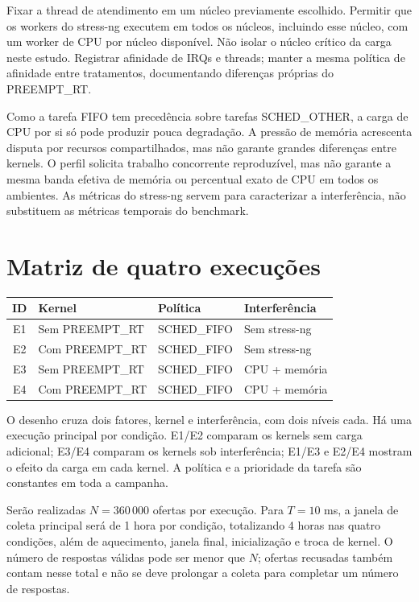 \documentclass[11pt,a4paper]{article}
\begin{document}
Fixar a thread de atendimento em um núcleo previamente escolhido. Permitir que os workers do stress-ng executem em todos os núcleos, incluindo esse núcleo, com um worker de CPU por núcleo disponível. Não isolar o núcleo crítico da carga neste estudo. Registrar afinidade de IRQs e threads; manter a mesma política de afinidade entre tratamentos, documentando diferenças próprias do PREEMPT\_RT.

Como a tarefa FIFO tem precedência sobre tarefas SCHED\_OTHER, a carga de CPU por si só pode produzir pouca degradação. A pressão de memória acrescenta disputa por recursos compartilhados, mas não garante grandes diferenças entre kernels. O perfil solicita trabalho concorrente reproduzível, mas não garante a mesma banda efetiva de memória ou percentual exato de CPU em todos os ambientes. As métricas do stress-ng servem para caracterizar a interferência, não substituem as métricas temporais do benchmark.

\section{Matriz de quatro execuções}
\begin{center}
\begin{tabularx}{\textwidth}{cllY}
\toprule
ID & Kernel & Política & Interferência \\
\midrule
E1 & Sem PREEMPT\_RT & SCHED\_FIFO & Sem stress-ng \\
E2 & Com PREEMPT\_RT & SCHED\_FIFO & Sem stress-ng \\
E3 & Sem PREEMPT\_RT & SCHED\_FIFO & CPU + memória \\
E4 & Com PREEMPT\_RT & SCHED\_FIFO & CPU + memória \\
\bottomrule
\end{tabularx}
\end{center}

O desenho cruza dois fatores, kernel e interferência, com dois níveis cada. Há uma execução principal por condição. E1/E2 comparam os kernels sem carga adicional; E3/E4 comparam os kernels sob interferência; E1/E3 e E2/E4 mostram o efeito da carga em cada kernel. A política e a prioridade da tarefa são constantes em toda a campanha.

Serão realizadas $N=360\,000$ ofertas por execução. Para $T=10$ ms, a janela de coleta principal será de 1 hora por condição, totalizando 4 horas nas quatro condições, além de aquecimento, janela final, inicialização e troca de kernel. O número de respostas válidas pode ser menor que $N$; ofertas recusadas também contam nesse total e não se deve prolongar a coleta para completar um número de respostas.
\end{document}
